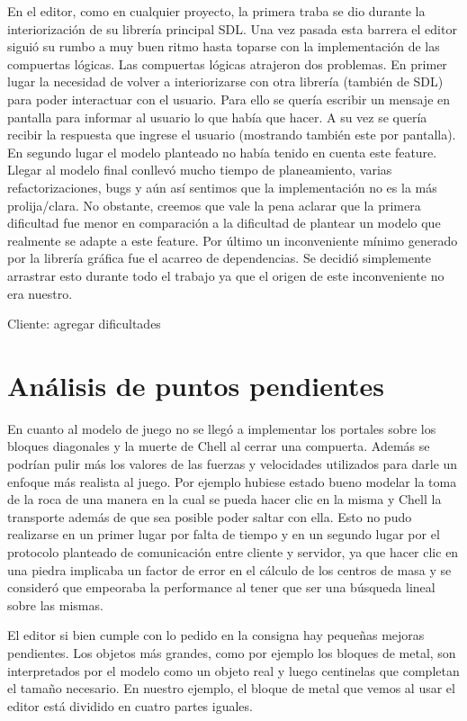 \documentclass[a4paper]{article}
\begin{document}
En el editor, como en cualquier proyecto, la primera traba se dio durante la interiorización de su librería principal SDL. Una vez pasada esta barrera el editor siguió su rumbo a muy buen ritmo hasta toparse con la implementación de las compuertas lógicas.
Las compuertas lógicas atrajeron dos problemas. En primer lugar la necesidad de volver a interiorizarse con otra librería (también de SDL) para poder interactuar con el usuario. Para ello se quería escribir un mensaje en pantalla para informar al usuario lo que había que hacer. A su vez se quería recibir la respuesta que ingrese el usuario (mostrando también este por pantalla).  En segundo lugar el modelo planteado no había tenido en cuenta este feature. Llegar al modelo final conllevó mucho tiempo de planeamiento, varias refactorizaciones, bugs y aún así sentimos que la implementación no es la más prolija/clara. No obstante, creemos que vale la pena aclarar que la primera dificultad fue menor en comparación a la dificultad de plantear un modelo que realmente se adapte a este feature.
Por último un inconveniente mínimo generado por la librería gráfica fue el acarreo de dependencias. Se decidió simplemente arrastrar esto durante todo el trabajo ya que el origen de este inconveniente no era nuestro.


Cliente: agregar dificultades

\section{Análisis de puntos pendientes}

En cuanto al modelo de juego no se llegó a implementar los portales sobre los bloques diagonales y la muerte de Chell al cerrar una compuerta. Además se podrían pulir más los valores de las fuerzas y velocidades utilizados para darle un enfoque más realista al juego. Por ejemplo hubiese estado bueno modelar la toma de la roca de una manera en la cual se pueda hacer clic en la misma y Chell la transporte además de que sea posible poder saltar con ella. Esto no pudo realizarse en un primer lugar por falta de tiempo y en un segundo lugar por el protocolo planteado de comunicación entre cliente y servidor, ya que hacer clic en una piedra implicaba un factor de error en el cálculo de los centros de masa y se consideró que empeoraba la performance al tener que ser una búsqueda lineal sobre las mismas. 

El editor si bien cumple con lo pedido en la consigna hay pequeñas mejoras pendientes. Los objetos más grandes, como por ejemplo los bloques de metal, son interpretados por el modelo como un objeto real y luego centinelas que completan el tamaño necesario. En nuestro ejemplo, el bloque de metal que vemos al usar el editor está dividido en cuatro partes iguales.
\end{document}
